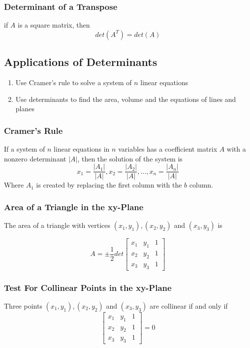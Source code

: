 \documentclass[12pt, letterpaper, twoside]{article}
\begin{document}
\subsubsection*{Determinant of a Transpose}
if $A$ is a square matrix, then 
$$det(A^T) = det(A)$$

\subsection{Applications of Determinants}
\begin{enumerate}
\item Use Cramer's rule to solve a system of $n$ linear equations
\item Use determinants to find the area, volume and the equations of lines and planes
\end{enumerate}

\subsubsection*{Cramer's Rule}
If a system of $n$ linear equations in $n$ variables has a coefficient matrix $A$ with a nonzero determinant $|A|$, then the solution of the system is 
$$x_1 = \frac{|A_1|}{|A|}, x_2 = \frac{|A_2|}{|A|}, \dots, x_n = \frac{|A_n|}{|A|}$$
Where $A_1$ is created by replacing the first column with the $b$ column.

\subsubsection*{Area of a Triangle in the xy-Plane}
The area of a triangle with vertices $(x_1,y_1), (x_2,y_2)$ and $(x_3, y_3)$ is 

$$
A = \pm \frac{1}{2} det
\begin{bmatrix}
 x_1 & y_1 & 1\\
 x_2 & y_2 & 1\\
 x_3 & y_3 & 1
\end{bmatrix}
$$

\subsubsection*{Test For Collinear Points in the xy-Plane}
Three points $(x_1,y_1), (x_2,y_2)$ and $(x_3, y_3)$ are collinear if and only if 
$$
\begin{bmatrix}
 x_1 & y_1 & 1\\
 x_2 & y_2 & 1\\
 x_3 & y_3 & 1
\end{bmatrix}
= 0
$$
\end{document}
